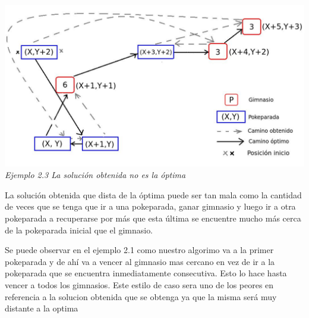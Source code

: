   
\vspace*{0.3cm} \vspace*{0.3cm}
  \begin{center}
\includegraphics[scale=0.60]{./EJ2/nooptima2.jpeg}
\\{\textit{Ejemplo 2.3 La soluci\'on obtenida no es la \'optima}}
  \end{center}
  \vspace*{0.3cm}

La soluci\'on obtenida que dista de la \'optima puede ser tan mala como la cantidad de veces que se tenga que ir a una pokeparada, ganar gimnasio y luego ir a otra pokeparada a recuperarse por m\'as que esta \'ultima se encuentre mucho m\'as cerca de la pokeparada inicial que el gimnasio.

Se puede observar en el ejemplo 2.1 como nuestro algorimo va a la primer pokeparada y de ah\'i va a vencer al gimnasio mas cercano en vez de ir a la pokeparada que se encuentra inmediatamente consecutiva. Esto lo hace hasta vencer a todos los gimnasios.
Este estilo de caso sera uno de los peores en referencia a la solucion obtenida que se obtenga ya que la misma ser\'a muy distante a la optima
